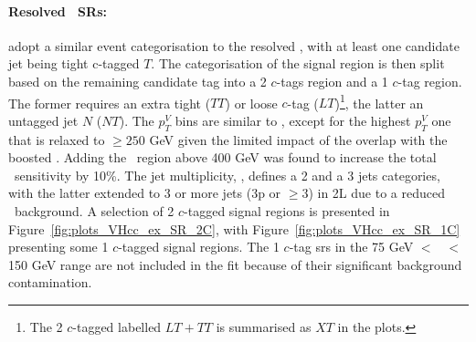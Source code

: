 \paragraph{Resolved \boldvhc\ SRs:} adopt a similar event categorisation to the resolved \vhb, with at least one candidate jet being tight c-tagged $T$. The categorisation of the signal region is then split based on the remaining candidate tag into a 2 $c$-tags region and a 1 $c$-tag region. The former requires an extra tight ($TT$) or loose $c$-tag ($LT$)\footnote{The 2 $c$-tagged labelled $LT+TT$ is summarised as $XT$ in the plots.}, the latter an untagged jet $N$ ($NT$). The $p_T^V$ bins are similar to \vhb, except for the highest $p_T^V$ one that is relaxed to $\geq 250$ GeV given the limited impact of the overlap with the boosted \vhb. Adding the \ptv\ region above 400 GeV was found to increase the total \vhc\ sensitivity by 10\%. The jet multiplicity, \nj, defines a 2 and a 3 jets categories, with the latter extended to 3 or more jets (3p or $\geq$3) in 2L due to a reduced \ttb\ background. A selection of 2 $c$-tagged signal regions is presented in Figure~\ref{fig:plots_VHcc_ex_SR_2C}, with Figure~\ref{fig:plots_VHcc_ex_SR_1C} presenting some 1 $c$-tagged signal regions. The 1 $c$-tag \glspl{sr} in the 75 GeV $<$ \ptv\ $<$ 150 GeV range are not included in the fit because of their significant background contamination.


